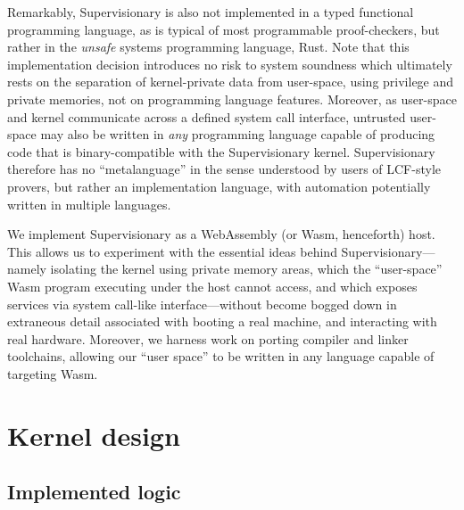 \documentclass[a4paper, UKenglish, cleveref, autoref, thm-restate]{lipics-v2021}
\begin{document}
Remarkably, Supervisionary is also not implemented in a typed functional programming language, as is typical of most programmable proof-checkers, but rather in the \emph{unsafe} systems programming language, Rust.
Note that this implementation decision introduces no risk to system soundness which ultimately rests on the separation of kernel-private data from user-space, using privilege and private memories, not on programming language features.
Moreover, as user-space and kernel communicate across a defined system call interface, untrusted user-space may also be written in \emph{any} programming language capable of producing code that is binary-compatible with the Supervisionary kernel.
Supervisionary therefore has no ``metalanguage'' in the sense understood by users of LCF-style provers, but rather an implementation language, with automation potentially written in multiple languages.

We implement Supervisionary as a WebAssembly (or Wasm, henceforth) host.
This allows us to experiment with the essential ideas behind Supervisionary---namely isolating the kernel using private memory areas, which the ``user-space'' Wasm program executing under the host cannot access, and which exposes services via system call-like interface---without become bogged down in extraneous detail associated with booting a real machine, and interacting with real hardware.
Moreover, we harness work on porting compiler and linker toolchains, allowing our ``user space'' to be written in any language capable of targeting Wasm.

\section{Kernel design}
\label{sect.kernel.design}

\subsection{Implemented logic}
\label{subsect.implemented.logic}
\end{document}
